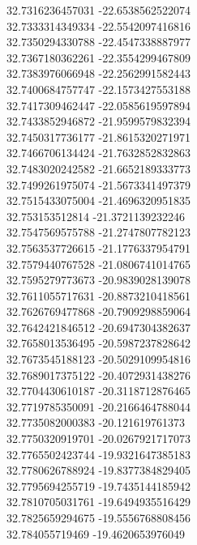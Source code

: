 {32.7316236457031	-22.6538562522074\\
32.7333314349334	-22.5542097416816\\
32.7350294330788	-22.4547338887977\\
32.7367180362261	-22.3554299467809\\
32.7383976066948	-22.2562991582443\\
32.7400684757747	-22.1573427553188\\
32.7417309462447	-22.0585619597894\\
32.7433852946872	-21.9599579832394\\
32.7450317736177	-21.8615320271971\\
32.7466706134424	-21.7632852832863\\
32.7483020242582	-21.6652189333773\\
32.7499261975074	-21.5673341497379\\
32.7515433075004	-21.4696320951835\\
32.753153512814	-21.3721139232246\\
32.7547569575788	-21.2747807782123\\
32.7563537726615	-21.1776337954791\\
32.7579440767528	-21.0806741014765\\
32.7595279773673	-20.9839028139078\\
32.7611055717631	-20.8873210418561\\
32.7626769477868	-20.7909298859064\\
32.7642421846512	-20.6947304382637\\
32.7658013536495	-20.5987237828642\\
32.7673545188123	-20.5029109954816\\
32.7689017375122	-20.4072931438276\\
32.7704430610187	-20.3118712876465\\
32.7719785350091	-20.2166464788044\\
32.7735082000383	-20.121619761373\\
32.7750320919701	-20.0267921717073\\
32.7765502423744	-19.9321647385183\\
32.7780626788924	-19.8377384829405\\
32.7795694255719	-19.7435144185942\\
32.7810705031761	-19.6494935516429\\
32.7825659294675	-19.5556768808456\\
32.784055719469	-19.4620653976049\\
}
